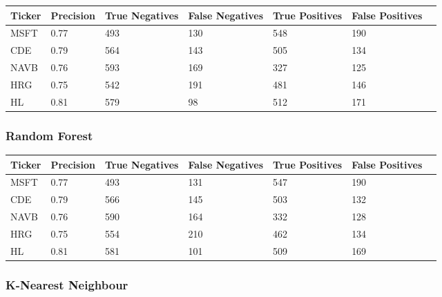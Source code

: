 \begin{center}
    \begin{tabular}{ | l | l | l | | l | l | l | p{5cm} |}
    \hline
    Ticker & Precision & True Negatives & False Negatives & True Positives & False Positives \\ \hline
    MSFT & 0.77 & 493 & 130 & 548 & 190 \\ \hline
    CDE & 0.79 & 564 & 143 & 505 & 134 \\ \hline
    NAVB & 0.76 & 593 & 169 & 327 & 125 \\ \hline
    HRG & 0.75 & 542 & 191 & 481 & 146 \\ \hline
    HL & 0.81 & 579 & 98 & 512 & 171 \\
    \hline
    \end{tabular}
    \label{table:nonfloat}
\end{center}

\subsubsection{Random Forest}

\begin{center}    
    \begin{tabular}{ | l | l | l | | l | l | l | p{5cm} |}
    \hline
    Ticker & Precision & True Negatives & False Negatives & True Positives & False Positives \\ \hline
    MSFT & 0.77 & 493 & 131 & 547 & 190 \\ \hline
    CDE & 0.79 & 566 & 145 & 503 & 132 \\ \hline
    NAVB & 0.76 & 590 & 164 & 332 & 128 \\ \hline
    HRG & 0.75 & 554 & 210 & 462 & 134 \\ \hline
    HL & 0.81 & 581 & 101 & 509 & 169 \\
    \hline
    \end{tabular}
    \label{table:nonfloat}
\end{center}

\subsubsection{K-Nearest Neighbour}

